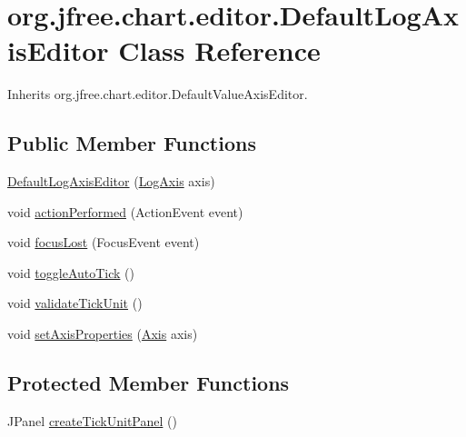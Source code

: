 \hypertarget{classorg_1_1jfree_1_1chart_1_1editor_1_1_default_log_axis_editor}{}\section{org.\+jfree.\+chart.\+editor.\+Default\+Log\+Axis\+Editor Class Reference}
\label{classorg_1_1jfree_1_1chart_1_1editor_1_1_default_log_axis_editor}


Inherits org.\+jfree.\+chart.\+editor.\+Default\+Value\+Axis\+Editor.

\subsection*{Public Member Functions}
\begin{DoxyCompactItemize}
\item 
\mbox{\hyperlink{classorg_1_1jfree_1_1chart_1_1editor_1_1_default_log_axis_editor_a4264e80f413146b25c6d2da5efe6d3e6}{Default\+Log\+Axis\+Editor}} (\mbox{\hyperlink{classorg_1_1jfree_1_1chart_1_1axis_1_1_log_axis}{Log\+Axis}} axis)
\item 
void \mbox{\hyperlink{classorg_1_1jfree_1_1chart_1_1editor_1_1_default_log_axis_editor_a0607ca3a594ae796ad788e0f231bc1b2}{action\+Performed}} (Action\+Event event)
\item 
void \mbox{\hyperlink{classorg_1_1jfree_1_1chart_1_1editor_1_1_default_log_axis_editor_a0053c1daec9b52a67cf85e64e50fec22}{focus\+Lost}} (Focus\+Event event)
\item 
void \mbox{\hyperlink{classorg_1_1jfree_1_1chart_1_1editor_1_1_default_log_axis_editor_ab65977baa301284ed1e42e287db8f0f2}{toggle\+Auto\+Tick}} ()
\item 
void \mbox{\hyperlink{classorg_1_1jfree_1_1chart_1_1editor_1_1_default_log_axis_editor_a95ad3390fd047534e2c25452cdae0be5}{validate\+Tick\+Unit}} ()
\item 
void \mbox{\hyperlink{classorg_1_1jfree_1_1chart_1_1editor_1_1_default_log_axis_editor_a617e8eda0a3092864e7651a895aeeaee}{set\+Axis\+Properties}} (\mbox{\hyperlink{classorg_1_1jfree_1_1chart_1_1axis_1_1_axis}{Axis}} axis)
\end{DoxyCompactItemize}
\subsection*{Protected Member Functions}
\begin{DoxyCompactItemize}
\item 
J\+Panel \mbox{\hyperlink{classorg_1_1jfree_1_1chart_1_1editor_1_1_default_log_axis_editor_ad143edd5d1ad3f9bbe8b6a47dc5b40a3}{create\+Tick\+Unit\+Panel}} ()
\end{DoxyCompactItemize}


